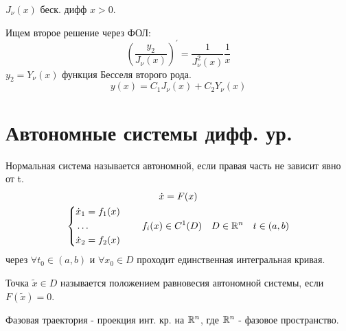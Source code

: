 \documentclass{article}
\begin{document}
$J_\nu(x)$ беск. дифф $x>0$.

Ищем второе решение через ФОЛ:
\[
  \left(\frac{y_2}{J_\nu(x)}\right)^{'}=\frac{1}{J_\nu^{2}(x)}\frac{1}{x}
\]
$y_2=Y_\nu(x)$ функция Бесселя второго рода.
\[
  y(x)=C_1J_\nu(x)+C_2Y_\nu(x)
\]



\section{Автономные системы дифф. ур.}
\begin{definition}
  Нормальная система называется автономной, если правая часть
  не зависит явно от t.
  \begin{gather*}
    \dot{x}=F(x) \\ 
    \left\{\begin{aligned}
      & \dot{x}_1=f_1(x) \\ 
      & \dots \\
      & \dot{x}_2=f_2(x)
    \end{aligned}\right.
    \qquad f_i(x)\in C^{1}(D) \quad D\in \mathbb{R}^{n} \quad t\in(a,b)
  \end{gather*}
  через $\forall t_0 \in (a,b)$ и $\forall x_{0}\in D$ проходит единственная
  интегральная кривая.
\end{definition}
\begin{definition}
  Точка $\tilde{x} \in D$ называется положением равновесия автономной системы,
  если $F(\tilde{x})=0$.
\end{definition}

\begin{definition}
  Фазовая траектория - проекция инт. кр. на $\mathbb{R}^{n}$, где $\mathbb{R}^{n}$
  - фазовое пространство.
\end{definition}
\end{document}
